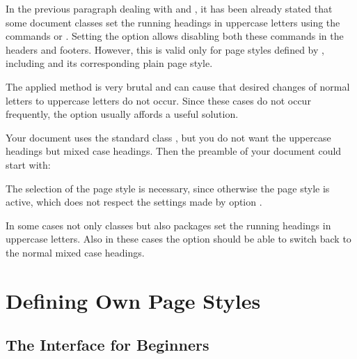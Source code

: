 \begin{Declaration}
\end{Declaration}%
%
In the previous paragraph dealing with  and
, it has been already stated that some document classes
set the running headings in uppercase letters using the
commands
or .
Setting the option  allows disabling both these commands
in the headers and footers.  However, this is valid only for page styles
defined by , including  and its
corresponding plain page style.

The applied method is very brutal and can cause that desired changes
of normal letters to uppercase letters  do
not occur.  Since these cases do not occur frequently, the option
 usually affords a useful solution.
\begin{Example}
  Your document uses the standard class ,
  but you do not want the uppercase headings but mixed case
  headings. Then the preamble of your document could start with:
  The selection of the page style  is necessary,
  since otherwise the page style  is active, which
  does not respect the settings made by option .
\end{Example}

In some cases not only classes but also packages set the running
headings in uppercase letters.
Also in these cases the option  should be able
to switch back to the normal mixed case headings.%
%


\section{Defining Own Page Styles}
%
% 
\subsection{The Interface for Beginners}
{}

